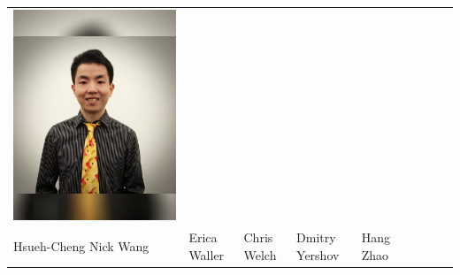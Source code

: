 \documentclass[landscape,a0paper,fontscale=0.292]{baposter}
\begin{document}
\begin{poster}
{\begin{center}
\begin{tabularx}{\linewidth}{X X X X X X X X X}
{\centering \includegraphics[width=0.65\linewidth]{zhao.jpg}}&
&&&\\

{\tiny \centering Hsueh-Cheng Nick Wang }& {\tiny \centering Erica Waller }& {\tiny \centering Chris Welch }& {\tiny \centering Dmitry Yershov }& {\tiny \centering Hang Zhao }& &&&\\

 
            \end{tabularx}
            \end{center}
            
            }
\end{poster}
\end{document}
